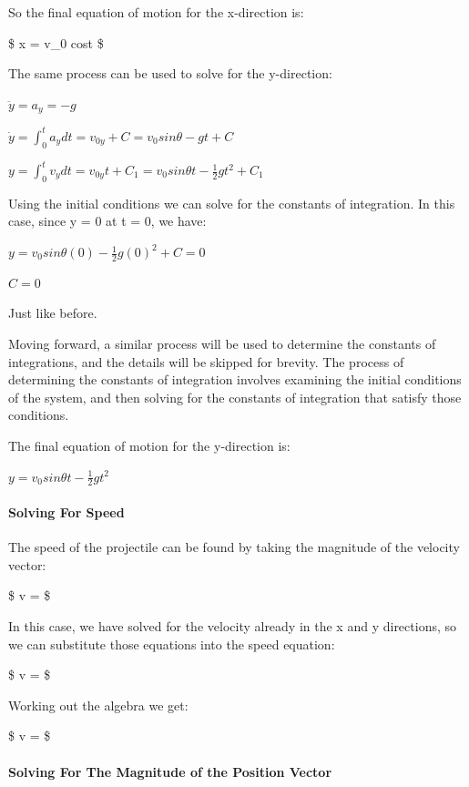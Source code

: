 \documentclass[11pt]{article}
\begin{document}
So the final equation of motion for the x-direction is:

\$ x = v\_0 cos\theta t \$

The same process can be used to solve for the y-direction:

\(\ddot{y} = a_y = -g\)

\(\dot{y} = \int_{0}^{t} a_y dt = v_{0y} + C = v_0 sin\theta - gt + C\)

\(y = \int_{0}^{t} v_y dt = v_{0y}t + C_1 = v_0 sin\theta t - \frac{1}{2}gt^2 + C_1\)

Using the initial conditions we can solve for the constants of
integration. In this case, since y = 0 at t = 0, we have:

\(y = v_0 sin\theta (0) - \frac{1}{2}g(0)^2 + C = 0\)

\(C = 0\)

Just like before.

Moving forward, a similar process will be used to determine the
constants of integrations, and the details will be skipped for brevity.
The process of determining the constants of integration involves
examining the initial conditions of the system, and then solving for the
constants of integration that satisfy those conditions.

The final equation of motion for the y-direction is:

\(y = v_0 sin\theta t - \frac{1}{2}gt^2\)

    \hypertarget{solving-for-speed}{%
\paragraph{\texorpdfstring{\textbf{Solving For
Speed}}{Solving For Speed}}\label{solving-for-speed}}

The speed of the projectile can be found by taking the magnitude of the
velocity vector:

\$ v =  \$

In this case, we have solved for the velocity already in the x and y
directions, so we can substitute those equations into the speed
equation:

\$ v =  \$

Working out the algebra we get:

\$ v =  \$

\hypertarget{solving-for-the-magnitude-of-the-position-vector}{%
\paragraph{\texorpdfstring{\textbf{Solving For The Magnitude of the
Position
Vector}}{Solving For The Magnitude of the Position Vector}}\label{solving-for-the-magnitude-of-the-position-vector}}
\end{document}
